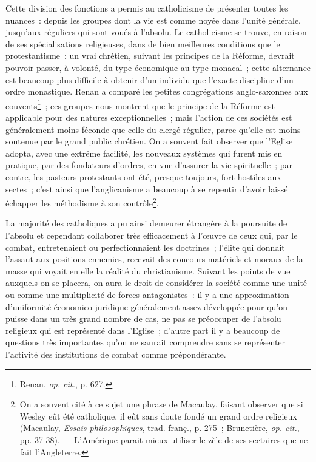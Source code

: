 \documentclass[french,twoside]{book} %
\begin{document}
Cette division des fonctions a permis au catholicisme de présenter toutes les nuances : depuis les groupes dont la vie est comme noyée dans l’unité générale, jusqu’aux  réguliers qui sont voués à l’absolu. Le catholicisme se trouve, en raison de ses spécialisations religieuses, dans de bien meilleures conditions que le protestantisme : un vrai chrétien, suivant les principes de la Réforme, devrait pouvoir passer, à volonté, du type économique au type monacal ; cette alternance est beaucoup plus difficile à obtenir d’un individu que l’exacte discipline d’un ordre monastique. Renan a comparé les petites congrégations anglo-saxonnes aux couvents\footnote{ \noindent Renan, \emph{op. cit.}, p. 627.
 } ; ces groupes nous montrent que le principe de la Réforme est applicable pour des natures exceptionnelles ; mais l’action de ces sociétés est généralement moins féconde que celle du clergé régulier, parce qu’elle est moins soutenue par le grand public chrétien. On a souvent fait observer que l’Eglise adopta, avec une extrême facilité, les nouveaux systèmes qui furent mis en pratique, par des fondateurs d’ordres, en vue d’assurer la vie spirituelle ; par contre, les pasteurs protestants ont été, presque toujours, fort hostiles aux sectes ; c’est ainsi que l’anglicanisme a beaucoup à se repentir d’avoir laissé échapper les méthodisme à son contrôle\footnote{ \noindent On a souvent cité à ce sujet une phrase de Macaulay, faisant observer que si Wesley eût été catholique, il eût sans doute fondé un grand ordre religieux (Macaulay, \emph{Essais philosophiques}, trad. franç., p. 275 ; Brunetière, \emph{op. cit.}, pp. 37-38). — L’Amérique parait mieux utiliser le zèle de ses sectaires que ne fait l’Angleterre.
 }.\par
La majorité des catholiques a pu ainsi demeurer étrangère à la poursuite de l’absolu et cependant collaborer très efficacement à l’œuvre de ceux qui, par le combat,  entretenaient ou perfectionnaient les doctrines ; l’élite qui donnait l’assaut aux positions ennemies, recevait des concours matériels et moraux de la masse qui voyait en elle la réalité du christianisme. Suivant les points de vue auxquels on se placera, on aura le droit de considérer la société comme une unité ou comme une multiplicité de forces antagonistes : il y a une approximation d’uniformité économico-juridique généralement assez développée pour qu’on puisse dans un très grand nombre de cas, ne pas se préoccuper de l’absolu religieux qui est représenté dans l’Eglise ; d’autre part il y a beaucoup de questions très importantes qu’on ne saurait comprendre sans se représenter l’activité des institutions de combat comme prépondérante.\par
\end{document}
